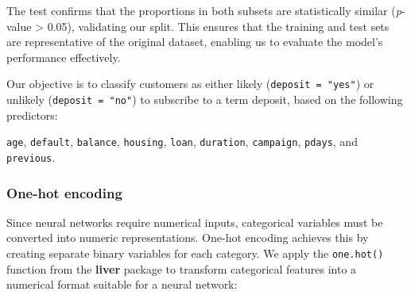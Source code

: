 \documentclass[
  11pt,
]{book}
\newcommand{\passthrough}[1]{#1}
\theoremstyle{definition}
\theoremstyle{definition}
\theoremstyle{definition}
\theoremstyle{definition}
\theoremstyle{remark}
\begin{document}
The test confirms that the proportions in both subsets are statistically similar (\emph{p}-value \textgreater{} 0.05), validating our split. This ensures that the training and test sets are representative of the original dataset, enabling us to evaluate the model's performance effectively.

Our objective is to classify customers as either likely (\passthrough{\lstinline!deposit = "yes"!}) or unlikely (\passthrough{\lstinline!deposit = "no"!}) to subscribe to a term deposit, based on the following predictors:

\passthrough{\lstinline!age!}, \passthrough{\lstinline!default!}, \passthrough{\lstinline!balance!}, \passthrough{\lstinline!housing!}, \passthrough{\lstinline!loan!}, \passthrough{\lstinline!duration!}, \passthrough{\lstinline!campaign!}, \passthrough{\lstinline!pdays!}, and \passthrough{\lstinline!previous!}.

\subsubsection*{One-hot encoding}\label{one-hot-encoding-3}


Since neural networks require numerical inputs, categorical variables must be converted into numeric representations. One-hot encoding achieves this by creating separate binary variables for each category. We apply the \passthrough{\lstinline!one.hot()!} function from the \textbf{liver} package to transform categorical features into a numerical format suitable for a neural network:
\end{document}
